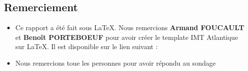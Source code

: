 \documentclass{article} %
\begin{document}
\subsection{Remerciement}
\begin{itemize}
	\item Ce rapport a été fait sous LaTeX. Nous remercions \textbf{Armand FOUCAULT} et \textbf{Benoît PORTEBOEUF} pour avoir créer le template IMT Atlantique sur LaTeX. Il est disponible sur le lien suivant :
	\item Nous remercions toue les personnes pour avoir répondu au sondage
\end{itemize}


\imtaMakeCover
\end{document}
